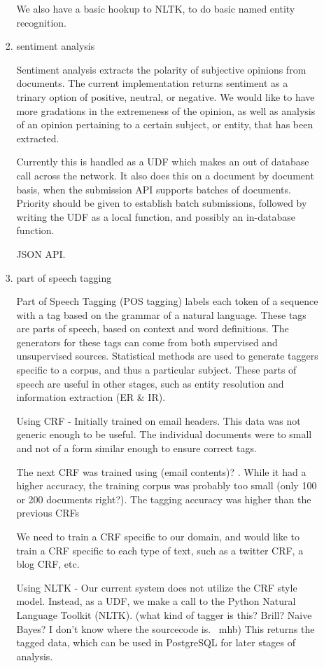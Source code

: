 \documentclass{article}
\begin{document}
\begin{enumerate}
\begin{enumerate}
\begin{enumerate}
      We also have a basic hookup to NLTK, to do basic named entity recognition.

    \item sentiment analysis

      Sentiment analysis extracts the polarity of subjective opinions from documents.
      The current implementation returns sentiment as a trinary option of positive, neutral, or negative.
      We would like to have more gradations in the extremeness of the opinion,
      as well as analysis of an opinion pertaining to a certain subject, or entity, that has been extracted.

      Currently this is handled as a UDF which makes an out of database call across the network.
      It also does this on a document by document basis,
      when the submission API supports batches of documents.
      Priority should be given to establish batch submissions,
      followed by writing the UDF as a local function,
      and possibly an in-database function.

      JSON API.


    \item part of speech tagging

      Part of Speech Tagging (POS tagging) labels each token of a sequence with a tag based on the grammar of a natural language.
      These tags are parts of speech, based on context and word definitions.
      The generators for these tags can come from both supervised and unsupervised sources.
      Statistical methods are used to generate taggers specific to a corpus, and thus a particular subject.
      These parts of speech are useful in other stages, such as entity resolution and information extraction (ER \& IR).

      Using CRF -
      Initially trained on email headers.
      This data was not generic enough to be useful.
      The individual documents were to small and not of a form similar enough to ensure correct tags.

      The next CRF was trained using (email contents)? .
      While it had a higher accuracy, the training corpus was probably too small (only 100 or 200 documents right?).
      The tagging accuracy was higher than the previous CRFs

      We need to train a CRF specific to our domain,
      and would like to train a CRF specific to each type of text,
      such as a twitter CRF, a blog CRF, etc.

      Using NLTK -
      Our current system does not utilize the CRF style model.
      Instead, as a UDF, we make a call to the Python Natural Language Toolkit (NLTK).
      (what kind of tagger is this? Brill? Naive Bayes? I don't know where the sourcecode is. ~mhb)
      This returns the tagged data, which can be used in PostgreSQL for later stages of analysis.



\end{enumerate}
\end{enumerate}
\end{enumerate}
\end{document}

